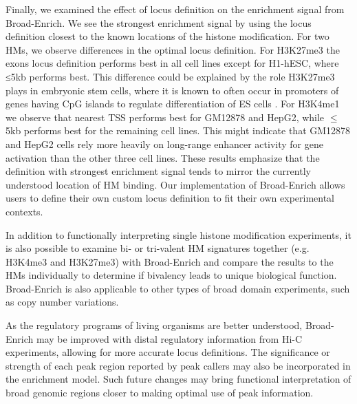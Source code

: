 Finally, we examined the effect of locus definition on the enrichment signal from Broad-Enrich. We see the strongest enrichment signal by using the locus definition closest to the known locations of the histone modification. For two HMs, we observe differences in the optimal locus definition. For H3K27me3 the exons locus definition performs best in all cell lines except for H1-hESC, where ≤5kb performs best. This difference could be explained by the role H3K27me3 plays in embryonic stem cells, where it is known to often occur in promoters of genes having CpG islands to regulate differentiation of ES cells \cite{Deaton:2011cz, Xie:2013fk}. For H3K4me1 we observe that nearest TSS performs best for GM12878 and HepG2, while $\leq$ 5kb performs best for the remaining cell lines. This might indicate that GM12878 and HepG2 cells rely more heavily on long-range enhancer activity for gene activation than the other three cell lines. These results emphasize that the definition with strongest enrichment signal tends to mirror the currently understood location of HM binding. Our implementation of Broad-Enrich allows users to define their own custom locus definition to fit their own experimental contexts.

In addition to functionally interpreting single histone modification experiments, it is also possible to examine bi- or tri-valent HM signatures together (e.g. H3K4me3 and H3K27me3) with Broad-Enrich and compare the results to the HMs individually to determine if bivalency leads to unique biological function. Broad-Enrich is also applicable to other types of broad domain experiments, such as copy number variations.

As the regulatory programs of living organisms are better understood, Broad-Enrich may be improved with distal regulatory information from Hi-C experiments, allowing for more accurate locus definitions. The significance or strength of each peak region reported by peak callers may also be incorporated in the enrichment model. Such future changes may bring functional interpretation of broad genomic regions closer to making optimal use of peak information.
